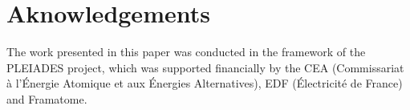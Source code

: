 \documentclass[3p,times,fleqn]{elsarticle}
\begin{document}

\tableofcontents








% 
% 
% 
% 
% 
% 

\section*{Aknowledgements}

The work presented in this paper was conducted in the framework of
the PLEIADES project, which was supported financially by the CEA
(Commissariat à l’Énergie Atomique et aux Énergies Alternatives), EDF
(Électricité de France) and Framatome.


% 
% 
% 
% 











\end{document}
